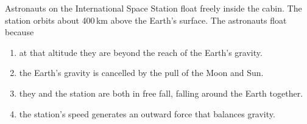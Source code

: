 \begin{checkpoint}
Astronauts on the International Space Station float freely inside the cabin.
The station orbits about 400\,km above the Earth's surface. The astronauts
float because
\begin{enumerate}[label=(\alph*), leftmargin=2.5em, itemsep=0pt]
  \item at that altitude they are beyond the reach of the Earth's gravity.
  \item the Earth's gravity is cancelled by the pull of the Moon and Sun.
  \item they and the station are both in free fall, falling around the Earth together.
  \item the station's speed generates an outward force that balances gravity.
\end{enumerate}
\end{checkpoint}

